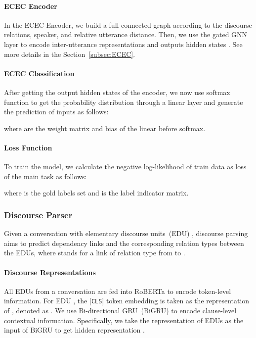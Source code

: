 \documentclass[11pt]{article}
\begin{document}
\paragraph{ECEC Encoder}
In the ECEC Encoder, we build a full connected graph according to the discourse relations, speaker, and relative utterance distance.
Then, we use the gated GNN layer to encode inter-utterance representations and outputs hidden states .
See more details in the Section~\ref{subsec:ECEC}.

\paragraph{ECEC Classification}
After getting the output hidden states  of the encoder, 
we now use softmax function to get the probability distribution  through a linear layer and generate the prediction  of inputs as follows:


where  are the weight matrix and bias of the linear before softmax.

\paragraph{Loss Function}
To train the model, we calculate the negative log-likelihood of train data as loss of the main task  as follows:

where  is the gold labels set and  is the label indicator matrix.

\subsubsection{Discourse Parser}

Given a conversation with  elementary discourse units~(EDU) , 
discourse parsing aims to predict dependency links and the corresponding relation types  between the EDUs, where  stands for a link of relation type  from  to .

\paragraph{Discourse Representations}
All EDUs from a conversation are fed into RoBERTa to encode token-level information.
For  EDU , the [\texttt{CLS}] token embedding is taken as the representation of , denoted as .
We use Bi-directional GRU~(BiGRU) to encode clause-level contextual information.
Specifically, we take the representation of EDUs  as the input of BiGRU to get hidden representation .
\end{document}
